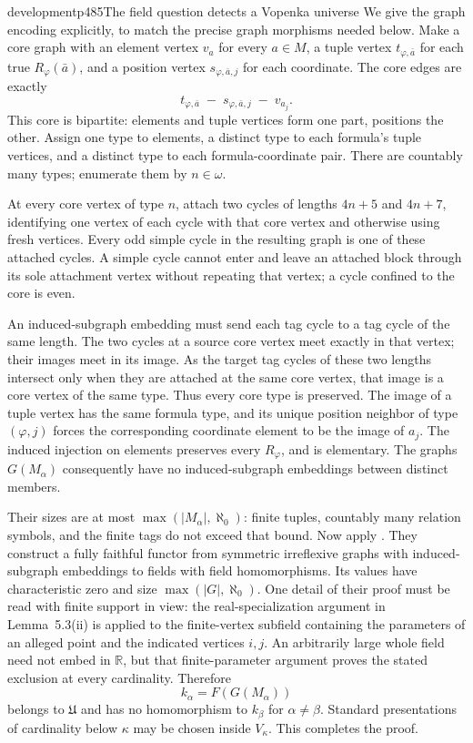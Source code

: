 \begin{dcomment}{development}{p485}{The field question detects a Vopenka universe}
We give the graph encoding explicitly, to match the precise graph morphisms needed below. Make a core graph with an element vertex $v_a$ for every $a\in M$, a tuple vertex $t_{\varphi,\bar a}$ for each true $R_\varphi(\bar a)$, and a position vertex $s_{\varphi,\bar a,j}$ for each coordinate. The core edges are exactly
\[
t_{\varphi,\bar a}\;-\;s_{\varphi,\bar a,j}\;-\;v_{a_j}.
\]
This core is bipartite: elements and tuple vertices form one part, positions the other. Assign one type to elements, a distinct type to each formula's tuple vertices, and a distinct type to each formula-coordinate pair. There are countably many types; enumerate them by $n\in\omega$.

At every core vertex of type $n$, attach two cycles of lengths $4n+5$ and $4n+7$, identifying one vertex of each cycle with that core vertex and otherwise using fresh vertices. Every odd simple cycle in the resulting graph is one of these attached cycles. A simple cycle cannot enter and leave an attached block through its sole attachment vertex without repeating that vertex; a cycle confined to the core is even.

An induced-subgraph embedding must send each tag cycle to a tag cycle of the same length. The two cycles at a source core vertex meet exactly in that vertex; their images meet in its image. As the target tag cycles of these two lengths intersect only when they are attached at the same core vertex, that image is a core vertex of the same type. Thus every core type is preserved. The image of a tuple vertex has the same formula type, and its unique position neighbor of type $(\varphi,j)$ forces the corresponding coordinate element to be the image of $a_j$. The induced injection on elements preserves every $R_\varphi$, and is elementary. The graphs $G(M_\alpha)$ consequently have no induced-subgraph embeddings between distinct members.

Their sizes are at most $\max(|M_\alpha|,\aleph_0)$: finite tuples, countably many relation symbols, and the finite tags do not exceed that bound. Now apply \citet[Theorem~1.1, Section~5.A and Remark~5.1]{MillerPoonenSchoutensShlapentokh2018}. They construct a fully faithful functor from symmetric irreflexive graphs with induced-subgraph embeddings to fields with field homomorphisms. Its values have characteristic zero and size $\max(|G|,\aleph_0)$. One detail of their proof must be read with finite support in view: the real-specialization argument in Lemma~5.3(ii) is applied to the finite-vertex subfield containing the parameters of an alleged point and the indicated vertices $i,j$. An arbitrarily large whole field need not embed in $\mathbb R$, but that finite-parameter argument proves the stated exclusion at every cardinality. Therefore
\[
k_\alpha=F(G(M_\alpha))
\]
belongs to $\mathfrak U$ and has no homomorphism to $k_\beta$ for $\alpha\ne\beta$. Standard presentations of cardinality below $\kappa$ may be chosen inside $V_\kappa$. This completes the proof.


\end{dcomment}
